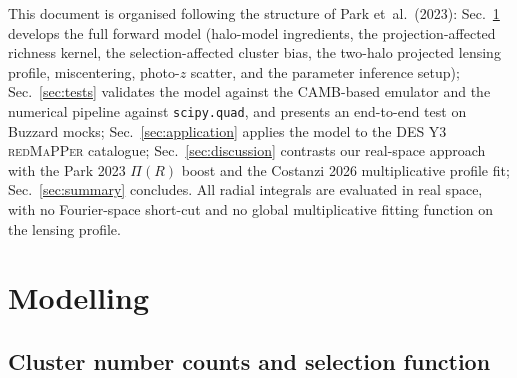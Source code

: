 \documentclass[a4paper, 11pt]{article}
\begin{document}
This document is organised following the structure of
Park et~al.\ (2023): Sec.~\ref{sec:modelling} develops the full
forward model (halo-model ingredients, the projection-affected richness
kernel, the selection-affected cluster bias, the two-halo projected
lensing profile, miscentering, photo-$z$ scatter, and the parameter
inference setup); Sec.~\ref{sec:tests} validates the model against the
CAMB-based emulator and the numerical pipeline against
\texttt{scipy.quad}, and presents an end-to-end test on Buzzard mocks;
Sec.~\ref{sec:application} applies the model to the DES Y3
\textsc{redMaPPer} catalogue; Sec.~\ref{sec:discussion} contrasts our
real-space approach with the Park 2023 $\Pi(R)$ boost and the
Costanzi 2026 multiplicative profile fit; Sec.~\ref{sec:summary}
concludes.  All radial integrals are evaluated in real space, with no
Fourier-space short-cut and no global multiplicative fitting function
on the lensing profile.

\section{Modelling}
\label{sec:modelling}

\subsection{Cluster number counts and selection function}
\label{sec:counts}
\end{document}
